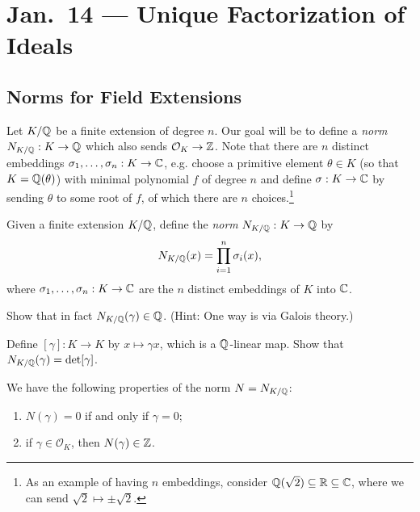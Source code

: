 \chapter{Jan.~14 --- Unique Factorization of Ideals}

\section{Norms for Field Extensions}

\begin{remark}
  Let $K / \mathbb{Q}$ be a finite extension of degree $n$.
  Our goal will be to define a \emph{norm}
  $N_{K / \mathbb{Q}} : K \to \mathbb{Q}$ which also sends
  $\mathcal{O}_K \to \mathbb{Z}$. Note that there are $n$
  distinct embeddings $\sigma_1, \dots, \sigma_n : K \to \mathbb{C}$, e.g.
  choose a primitive element $\theta \in K$
  (so that $K = \mathbb{Q}(\theta)$) with minimal polynomial
  $f$ of degree $n$ and define
  $\sigma : K \to \mathbb{C}$ by sending $\theta$ to
  some root of $f$, of which there are $n$ choices.\footnote{As an example of having $n$ embeddings, consider $\mathbb{Q}(\sqrt{2}) \subseteq \mathbb{R} \subseteq \mathbb{C}$, where we can send $\sqrt{2} \mapsto \pm \sqrt{2}$.}
\end{remark}

\begin{definition}
  Given a finite extension $K / \mathbb{Q}$, define the
  \emph{norm} $N_{K / \mathbb{Q}} : K \to \mathbb{Q}$ by
  \[
    N_{K / \mathbb{Q}}(x) = \prod_{i = 1}^n \sigma_i(x),
  \]
  where $\sigma_1, \dots, \sigma_n : K \to \mathbb{C}$
  are the $n$ distinct embeddings of $K$ into $\mathbb{C}$.
\end{definition}

\begin{exercise}
  Show that in fact $N_{K / \mathbb{Q}}(\gamma) \in \mathbb{Q}$. (Hint: One way is via Galois theory.)
\end{exercise}

\begin{exercise}
  Define $[\gamma] : K \to K$ by $x \mapsto \gamma x$,
  which is a $\mathbb{Q}$-linear map. Show that
  $N_{K / \mathbb{Q}}(\gamma) = \det [\gamma]$.
\end{exercise}

\begin{prop}
  We have the following properties of the norm $N = N_{K / \mathbb{Q}}$:
  \begin{enumerate}
    \item $N(\gamma) = 0$ if and only if $\gamma = 0$;
    \item if $\gamma \in \mathcal{O}_K$, then
      $N(\gamma) \in \mathbb{Z}$.
  \end{enumerate}
\end{prop}

